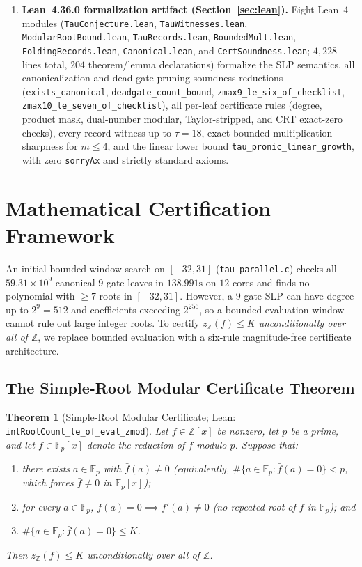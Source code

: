 \documentclass[11pt]{article}
\newtheorem{theorem}{Theorem}[section]
\newcommand{\Z}{\mathbb{Z}}
\newcommand{\F}{\mathbb{F}}
\newcommand{\code}[1]{\texttt{#1}}
\newcommand{\zZ}{z_{\Z}}
\begin{document}
\begin{enumerate}[label=\textbf{Result \arabic*.},leftmargin=2.2em]
  \item \textbf{Lean~4.36.0 formalization artifact (Section~\ref{sec:lean}).}
  Eight Lean~4 modules (\code{TauConjecture.lean}, \code{TauWitnesses.lean}, \code{ModularRootBound.lean}, \code{TauRecords.lean}, \code{BoundedMult.lean}, \code{FoldingRecords.lean}, \code{Canonical.lean}, and \code{CertSoundness.lean}; $4{,}228$ lines total, $204$ theorem/lemma declarations) formalize the SLP semantics, all canonicalization and dead-gate pruning soundness reductions (\code{exists\_canonical}, \code{deadgate\_count\_bound}, \code{zmax9\_le\_six\_of\_checklist}, \code{zmax10\_le\_seven\_of\_checklist}), all per-leaf certificate rules (degree, product mask, dual-number modular, Taylor-stripped, and CRT exact-zero checks), every record witness up to $\tau = 18$, exact bounded-multiplication sharpness for $m \le 4$, and the linear lower bound \code{tau\_pronic\_linear\_growth}, with zero \code{sorryAx} and strictly standard axioms.
\end{enumerate}

\section{Mathematical Certification Framework}\label{sec:framework}

An initial bounded-window search on $[-32, 31]$ (\code{tau\_parallel.c}) checks all $59.31 \times 10^9$ canonical $9$-gate leaves in $138.991\text{s}$ on $12$ cores and finds no polynomial with $\ge 7$ roots in $[-32, 31]$. However, a $9$-gate SLP can have degree up to $2^9 = 512$ and coefficients exceeding $2^{256}$, so a bounded evaluation window cannot rule out large integer roots. To certify $\zZ(f) \le K$ \emph{unconditionally over all of $\Z$}, we replace bounded evaluation with a six-rule magnitude-free certificate architecture.

\subsection{The Simple-Root Modular Certificate Theorem}

\begin{theorem}[Simple-Root Modular Certificate; Lean: \code{intRootCount\_le\_of\_eval\_zmod}]\label{thm:modular}
Let $f \in \Z[x]$ be nonzero, let $p$ be a prime, and let $\bar{f} \in \F_p[x]$ denote the reduction of $f$ modulo $p$. Suppose that:
\begin{enumerate}[label=(\roman*),leftmargin=1.8em]
  \item there exists $a \in \F_p$ with $\bar{f}(a) \neq 0$ (equivalently, $\#\{a \in \F_p : \bar{f}(a) = 0\} < p$, which forces $\bar{f} \neq 0$ in $\F_p[x]$);
  \item for every $a \in \F_p$, $\bar{f}(a) = 0 \implies \bar{f}'(a) \neq 0$ (no repeated root of $\bar{f}$ in $\F_p$); and
  \item $\#\{a \in \F_p : \bar{f}(a) = 0\} \le K$.
\end{enumerate}
Then $\zZ(f) \le K$ unconditionally over all of $\Z$.
\end{theorem}
\end{document}
